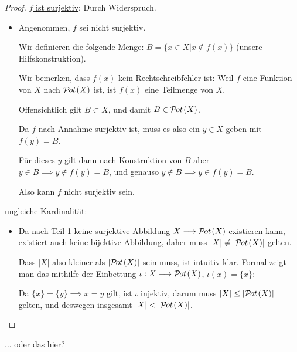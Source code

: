 \begin{proof}
    \underline{$f$ ist surjektiv}: Durch Widerspruch.

    \begin{itemize}[label=]
        \item Angenommen, $f$ sei nicht surjektiv.

        Wir definieren die folgende Menge: $B = \{x \in X | x \notin f(x)\}$ (unsere Hilfskonstruktion).
        
        Wir bemerken, dass $f(x)$ kein Rechtschreibfehler ist: Weil $f$ eine Funktion von $X$ nach $\mathcal{P}\hspace{-1pt}ot\hspace{1pt}(X)$ ist, ist $f(x)$ eine Teilmenge von $X$.

        Offensichtlich gilt $B \subset X$, und damit $B \in \mathcal{P}\hspace{-1pt}ot\hspace{1pt}(X)$.

        Da $f$ nach Annahme surjektiv ist, muss es also ein $y \in X$ geben mit $f(y) = B$.

        Für dieses $y$ gilt dann nach Konstruktion von $B$ aber $y \in B \implies y \notin f(y) = B$, und genauso $y \notin B \implies y \in f(y) = B$. \absurdum

        Also kann $f$ nicht surjektiv sein.
    \end{itemize}

    \underline{ungleiche Kardinalität}:
    
    \begin{itemize}[label=]
        \item Da nach Teil 1 keine surjektive Abbildung $X \longrightarrow \mathcal{P}\hspace{-1pt}ot\hspace{1pt}(X)$ existieren kann, existiert auch keine bijektive Abbildung, daher muss $|X| \neq |\mathcal{P}\hspace{-1pt}ot\hspace{1pt}(X)|$ gelten.

        Dass $|X|$ also kleiner als $|\mathcal{P}\hspace{-1pt}ot\hspace{1pt}(X)|$ sein muss, ist intuitiv klar. Formal zeigt man das mithilfe der Einbettung $\iota: X \longrightarrow \mathcal{P}\hspace{-1pt}ot\hspace{1pt}(X)$, $\iota(x) = \{x\}$:
        
        Da $\{x\} = \{y\} \implies x = y$ gilt, ist $\iota$ injektiv, darum muss $|X| \leq |\mathcal{P}\hspace{-1pt}ot\hspace{1pt}(X)|$ gelten, und deswegen insgesamt $|X| < |\mathcal{P}\hspace{-1pt}ot\hspace{1pt}(X)|$.
    \end{itemize}
\end{proof}

\addtocounter{query}{-1}
\begin{query}
    ... oder das hier?
\end{query}

